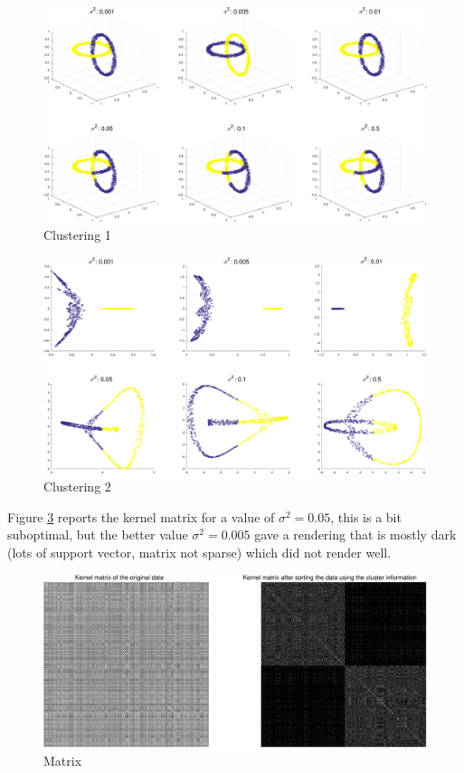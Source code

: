 \documentclass[11pt, a4paper]{article}
\begin{document}
\begin{figure}[H]
  \centering
  \includegraphics[scale=.40]{sclustering_origcl.pdf}
  \caption{Clustering 1}
  \label{fig:sclustering_origcl}
\end{figure}

\begin{figure}[H]
  \centering
  \includegraphics[scale=.40]{sclustering_origcl2.pdf}
  \caption{Clustering 2}
  \label{fig:sclustering_origcl2}
\end{figure}

Figure \ref{fig:sclustering_matrix} reports the kernel matrix for a
value of $\sigma^2=0.05$, this is a bit suboptimal, but the better
value $\sigma^2=0.005$ gave a rendering that is mostly dark (lots of
support vector, matrix not sparse) which did not render well. 


\begin{figure}[H]
  \centering
  \includegraphics[scale=.40]{scluster_matrix.pdf}
  \caption{Matrix}
  \label{fig:sclustering_matrix}
\end{figure}
\end{document}
